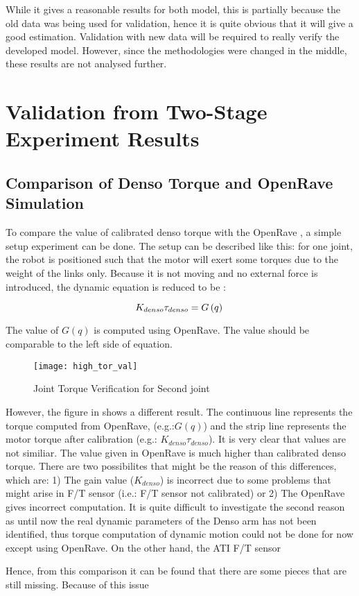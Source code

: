 While it gives a reasonable results for both model, this is partially because the old data was being used for validation, hence it is quite obvious that it will give a good estimation. Validation with new data will be required to really verify the developed model. However, since the methodologies were changed in the middle, these results are not analysed further.


\section{Validation from Two-Stage Experiment Results}
\subsection{Comparison of Denso Torque and OpenRave Simulation}
\label{Verification of Motor Torque Calibration}
To compare the value of calibrated denso torque with the OpenRave , a simple setup experiment can be done. The setup can be described like this: for one joint, the robot is positioned such that the motor will exert some torques due to the weight of the links only. Because it is not moving and no external force is introduced, the dynamic equation is reduced to be :

\begin{equation}
  K_{denso} \tau_{denso} = G\left(q \right) \\
\end{equation}

The value of $G\left(q \right)$ is computed using OpenRave. The value should be comparable to the left side of equation. 

\begin{figure}[H]
    \centering
    \texttt{[image: high\_tor\_val]}
    \caption{Joint Torque Verification for Second joint}
    \label{fig: tor verification}
\end{figure}

However, the figure in  shows a different result. The continuous line represents the torque computed from OpenRave, (e.g.:$G\left(q \right)$) and the strip line represents the motor torque after calibration (e.g.: $K_{denso} \tau_{denso}$). It is very clear that values are not similiar. The value given in OpenRave is much higher than calibrated denso torque. There are two possibilites that might be the reason of this differences, which are: 1) The gain value ($ K_{denso} $) is incorrect due to some problems that might arise in F/T sensor (i.e.: F/T sensor not calibrated) or 2) The OpenRave gives incorrect computation. It is quite difficult to investigate the second reason as until now the real dynamic parameters of the Denso arm has not been identified, thus torque computation of dynamic motion could not be done for now except using OpenRave. On the other hand, the ATI F/T sensor  

Hence, from this comparison it can be found that there are some pieces that are still missing. Because of this issue



